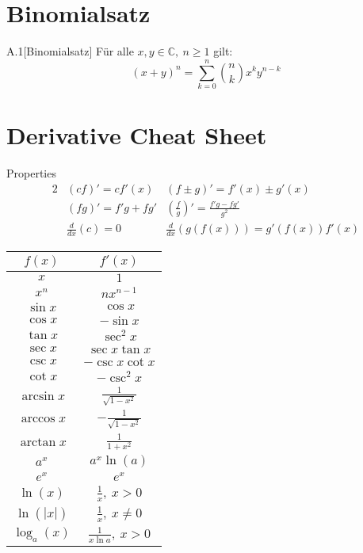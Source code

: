 \documentclass[8pt,a4paper,twocolumn,table]{extarticle}
\newcommand{\C}{\mathbb{C}}
\begin{document}
\section{Binomialsatz}
\begin{satz}{A.1}[Binomialsatz]
    Für alle $x,y \in \C,\ n \ge 1$ gilt:
    \[ (x + y)^n = \sum_{k=0}^n \binom{n}{k} x^k y^{n - k} \]
\end{satz}

\section{Derivative Cheat Sheet}

Properties
\begin{alignat*}{2}
     & (cf)' = c f'(x)     & (f \pm g)' = f'(x) \pm g'(x)                       \\
     & (fg)' = f'g + fg'   & (\frac{f}{g})' = \frac{f'g - fg'}{g^2}             \\
     & \frac{d}{dx}(c) = 0 & \frac{d}{dx}\left( g(f(x)) \right) = g'(f(x))f'(x)
\end{alignat*}

\begin{tabular}{|c | c |}
    \hline
    \rowcolor{lightgray} $f(x)$ & $f'(x)$                       \\
    \hline
    $x$                         & $1$                           \\
    \hline
    $x^n$                       & $nx^{n-1}$                    \\
    \hline
    $\sin x$                    & $\cos x$                      \\
    \hline
    $ \cos x $                  & $ -\sin x $                   \\
    \hline
    $ \tan x $                  & $ \sec^2 x $                  \\
    \hline
    $ \sec x $                  & $ \sec x \tan x $             \\
    \hline
    $ \csc x $                  & $ -\csc x \cot x$             \\
    \hline
    $ \cot x $                  & $ -\csc^2 x $                 \\
    \hline
    $ \arcsin x$                & $ \frac{1}{\sqrt{1 - x^2}} $  \\
    \hline
    $ \arccos x$                & $ -\frac{1}{\sqrt{1 - x^2}} $ \\
    \hline
    $ \arctan x$                & $ \frac{1}{1 + x^2} $         \\
    \hline
    $ a^x $                     & $ a^x \ln(a) $                \\
    \hline
    $ e^x $                     & $ e^x $                       \\
    \hline
    $ \ln(x) $                  & $ \frac{1}{x},\ x > 0 $       \\
    \hline
    $ \ln(|x|) $                & $ \frac{1}{x},\ x \ne 0 $     \\
    \hline
    $ \log_a(x) $               & $ \frac{1}{x \ln a},\ x > 0 $ \\
\end{tabular}
\end{document}
